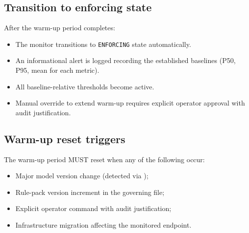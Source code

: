 \subsection{Transition to enforcing state}

After the warm-up period completes:
\begin{itemize}
  \item The monitor transitions to \texttt{ENFORCING} state
    automatically.
  \item An informational alert is logged recording the established
    baselines (P50, P95, mean for each metric).
  \item All baseline-relative thresholds become active.
  \item Manual override to extend warm-up requires explicit operator
    approval with audit justification.
\end{itemize}

\subsection{Warm-up reset triggers}

The warm-up period MUST reset when any of the following occur:
\begin{itemize}
  \item Major model version change (detected via
    );
  \item Rule-pack version increment in the governing
     file;
  \item Explicit operator command with audit justification;
  \item Infrastructure migration affecting the monitored endpoint.
\end{itemize}

